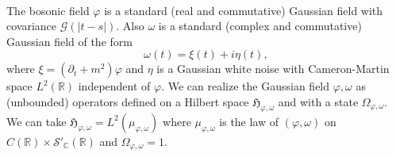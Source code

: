 \documentclass[a4paper,10pt]{article}
\begin{document}
\

The bosonic field $\varphi$ is a standard (real and commutative) Gaussian
field with covariance $\mathcal{G} (| t - s |)$. Also $\omega$ is a standard
(complex and commutative) Gaussian field of the form
\[ \omega (t) = \xi (t) + i \eta (t), \]
where $\xi = (\partial_t + m^2) \varphi$ and $\eta$ is a Gaussian white noise
with Cameron-Martin space $L^2 (\mathbb{R})$ independent of $\varphi$. We can
realize the Gaussian field $\varphi, \omega$ as (unbounded) operators defined
on a Hilbert space $\mathfrak{\mathfrak{H}_{\varphi, \omega}}$ and with a
state $\Omega_{\varphi, \omega}$. We can take $\mathfrak{H}_{\varphi, \omega}
= L^2 (\mu_{\varphi, \omega})$ where $\mu_{\varphi, \omega}$ is the law of
$(\varphi, \omega)$ on $C (\mathbb{R}) \times \mathcal{S}'_{\mathbb{C}}
(\mathbb{R})$ and $\Omega_{\varphi, \omega} = 1$.

\
\end{document}
